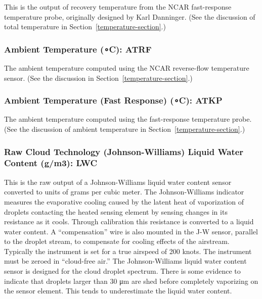 \documentclass[
]{book}
\begin{document}
This is the output of recovery temperature from the NCAR fast-response temperature probe, originally designed by Karl Danninger. (See the discussion of total temperature in Section~\ref{temperature-section}.)

\hypertarget{atrf}{%
\subsubsection*{\texorpdfstring{Ambient Temperature ({∘C}): ATRF}{Ambient Temperature (∘C): ATRF}}\label{atrf}}

The ambient temperature computed using the NCAR reverse-flow temperature sensor. (See the discussion in Section~\ref{temperature-section}.)

\hypertarget{atkp}{%
\subsubsection*{\texorpdfstring{Ambient Temperature (Fast Response) ({∘C}): ATKP}{Ambient Temperature (Fast Response) (∘C): ATKP}}\label{atkp}}

The ambient temperature computed using the fast-response temperature probe. (See the discussion of ambient temperature in Section~\ref{temperature-section}.)

\hypertarget{jwlwc}{%
\subsubsection*{\texorpdfstring{Raw Cloud Technology (Johnson-Williams) Liquid Water Content ({g/m3}): LWC}{Raw Cloud Technology (Johnson-Williams) Liquid Water Content (g/m3): LWC}}\label{jwlwc}}

This is the raw output of a Johnson-Williams liquid water content sensor converted to units of grams per cubic meter. The Johnson-Williams indicator measures the evaporative cooling caused by the latent heat of vaporization of droplets contacting the heated sensing element by sensing changes in its resistance as it cools. Through calibration this resistance is converted to a liquid water content. A ``compensation'' wire is also mounted in the J-W sensor, parallel to the droplet stream, to compensate for cooling effects of the airstream. Typically the instrument is set for a true airspeed of 200 knots. The instrument must be zeroed in ``cloud-free air.'' The Johnson-Williams liquid water content sensor is designed for the cloud droplet spectrum. There is some evidence to indicate that droplets larger than 30 {μm} are shed before completely vaporizing on the sensor element. This tends to underestimate the liquid water content.
\end{document}
